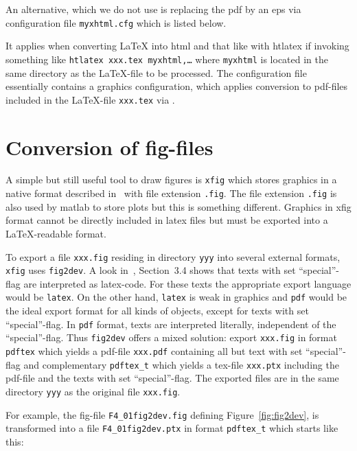 \documentclass[12pt]{book}
\newcommand{\gls}[1]{#1}
\renewcommand{\index}[1]{ }
\begin{document}
An alternative, which we do not use 
is replacing the pdf by an \gls{eps} via configuration file \texttt{myxhtml.cfg} 
which is listed below. 
%
\lstset{language=tex, basicstyle=\scriptsize}%

%
It applies when converting \LaTeX{} into html and that like 
with htlatex if invoking something like \texttt{htlatex xxx.tex myxhtml,\ldots} 
where \texttt{myxhtml} is located in the same directory as the \LaTeX-file 
to be processed. 
The configuration file essentially contains a graphics configuration, 
which applies conversion to pdf-files included in the \LaTeX-file \texttt{xxx.tex}
via . 


\section{Conversion of fig-files}\label{sec:fig2dev}

\index{xfig}
\index{fig2dev}
A simple but still useful tool to draw figures is \texttt{xfig} 
which stores graphics in a native format 
described in~\cite{XFigF} with file extension \texttt{.fig}. 
The file extension \texttt{.fig} is also used by matlab to store plots 
but this is something different. 
Graphics in xfig format cannot be directly included in latex files 
but must be exported into a \LaTeX-readable format. 

To export a file \texttt{xxx.fig} residing in directory \texttt{yyy} 
into several external formats, 
\texttt{xfig} uses \texttt{fig2dev}. 
A look in~\cite{XFigF}, Section~3.4 shows that texts with set ``special''-flag 
are interpreted as latex-code. 
For these texts the appropriate export language would be \texttt{latex}. 
On the other hand, \texttt{latex} is weak in graphics 
and \texttt{pdf} would be the ideal export format for all kinds of objects, 
except for texts with set ``special''-flag. 
In \texttt{pdf} format, texts are interpreted literally, 
independent of the ``special''-flag. 
Thus \texttt{fig2dev} offers a mixed solution: 
export \texttt{xxx.fig} in format \texttt{pdftex} which yields a pdf-file 
\texttt{xxx.pdf} containing all but text with set ``special''-flag 
and complementary \texttt{pdftex\_t} which yields a tex-file \texttt{xxx.ptx} 
including the pdf-file and the texts with set ``special''-flag. 
\index{special-flag}%
The exported files are in the same directory \texttt{yyy} 
as the original file \texttt{xxx.fig}. 

For example, 
the fig-file \texttt{F4\_01fig2dev.fig} defining Figure~\ref{fig:fig2dev}, 
is transformed into a file \texttt{F4\_01fig2dev.ptx} 
in format \texttt{pdftex\_t} which starts like this: 
%
\lstset{language=tex, breaklines, basicstyle=\footnotesize}

\end{document}
